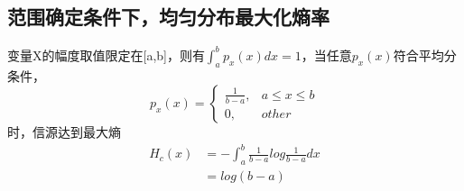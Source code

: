 \documentclass[a4paper, 12pt]{article}
\begin{document}
    \subsection{范围确定条件下，均匀分布最大化熵率}
    变量X的幅度取值限定在[a,b]，则有$\int_{a}^{b}p_x(x)dx=1$，当任意$p_x(x)$符合平均分条件，
    \[
        p_x(x)=
            \begin{cases}
                \frac{1}{b-a},&a\le x \le b\\
                0, &other
            \end{cases}
        \]
    时，信源达到最大熵
    \begin{equation}
        \begin{aligned}
            H_c(x)&=-\int_{a}^{b}\frac{1}{b-a}log\frac{1}{b-a}dx\\
            &=log(b-a)
        \end{aligned}
    \end{equation}
\end{document}
